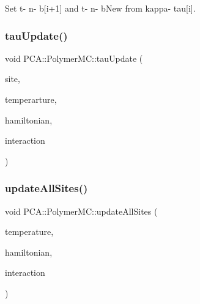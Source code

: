 Set t-\/ n-\/ b\mbox{[}i+1\mbox{]} and t-\/ n-\/ b\+New from kappa-\/ tau\mbox{[}i\mbox{]}. 

\hypertarget{class_p_c_a_1_1_polymer_m_c_a087b8392c8ec8eea5c069a1be4c46d2f}{}\label{class_p_c_a_1_1_polymer_m_c_a087b8392c8ec8eea5c069a1be4c46d2f} 
\subsubsection{\texorpdfstring{tau\+Update()}{tauUpdate()}}
{\footnotesize\ttfamily void P\+C\+A\+::\+Polymer\+M\+C\+::tau\+Update (\begin{DoxyParamCaption}\item[{int}]{site,  }\item[{double}]{temperarture,  }\item[{const \hyperlink{class_p_c_a_1_1_hamiltonian}{Hamiltonian} \&}]{hamiltonian,  }\item[{const \hyperlink{class_p_c_a_1_1_lennard_jones}{Lennard\+Jones} \&}]{interaction }\end{DoxyParamCaption})}

\hypertarget{class_p_c_a_1_1_polymer_m_c_a4bb5653f7159bce31cc0e476b4fd4c8e}{}\label{class_p_c_a_1_1_polymer_m_c_a4bb5653f7159bce31cc0e476b4fd4c8e} 
\subsubsection{\texorpdfstring{update\+All\+Sites()}{updateAllSites()}}
{\footnotesize\ttfamily void P\+C\+A\+::\+Polymer\+M\+C\+::update\+All\+Sites (\begin{DoxyParamCaption}\item[{double}]{temperature,  }\item[{const \hyperlink{class_p_c_a_1_1_hamiltonian}{Hamiltonian} \&}]{hamiltonian,  }\item[{const \hyperlink{class_p_c_a_1_1_lennard_jones}{Lennard\+Jones} \&}]{interaction }\end{DoxyParamCaption})}

\hypertarget{class_p_c_a_1_1_polymer_m_c_aabe0e104c1f34ebe2174a650b7cbe963}{}\label{class_p_c_a_1_1_polymer_m_c_aabe0e104c1f34ebe2174a650b7cbe963} 
